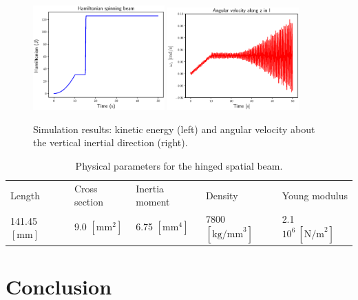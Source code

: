 \documentclass{svjour3}                     %
\begin{document}
\begin{figure}[tb]
	\centering
	\includegraphics[width=0.45\textwidth]{H_3Dbeam.eps} 
	\includegraphics[width=0.45\textwidth]{omega_zI.eps} 
	\caption{Simulation results: kinetic energy (left) and angular velocity about the vertical inertial direction (right).}
	\label{fig:H_omega}
\end{figure}

\begin{table}[tb]
	\caption{Physical parameters for the hinged spatial beam.}
	\label{tab:data_3Dbeam}       %
	\begin{tabular}{lllll}
		\hline\noalign{\smallskip}
		Length & Cross section & Inertia moment & Density & Young modulus \\
		\noalign{\smallskip}\hline\noalign{\smallskip}
		141.45 $[\mathrm{mm}]$ & 9.0 $[\mathrm{mm}^2]$ & 6.75 $[\mathrm{mm}^4]$ & 7800 $[\mathrm{kg/mm}^3]$ & 2.1 $10^6 \ [\mathrm{N/m}^2]$  \\
		\hline
	\end{tabular}
\end{table}


\section{Conclusion}




 

\end{document}
